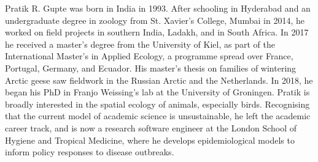 \label{ch:pubs}

\begingroup

Pratik R. Gupte was born in India in 1993.
After schooling in Hyderabad and an undergraduate degree in zoology from St. Xavier's College, Mumbai in 2014, he worked on field projects in southern India, Ladakh, and in South Africa.
In 2017 he received a master's degree from the University of Kiel, as part of the International Master's in Applied Ecology, a programme spread over France, Portugal, Germany, and Ecuador.
His master's thesis on families of wintering Arctic geese saw fieldwork in the Russian Arctic and the Netherlands.
In 2018, he began his PhD in Franjo Weissing's lab at the University of Groningen.
Pratik is broadly interested in the spatial ecology of animals, especially birds.
Recognising that the current model of academic science is unsustainable, he left the academic career track, and is now a research software engineer at the London School of Hygiene and Tropical Medicine, where he develops epidemiological models to inform policy responses to disease outbreaks.

\let\clearpage\relax
\let\cleardoublepage\relax
\let\cleardoublepage\relax

\begin{refsection}
    \small
    \nocite{gupte2021a,gupte2022c,gupte2022d,thaker2019,nathan2022,netz2022,ramesh2022,
        bijleveld2021,rimbach2022un,gupte2019} %
    \printbibliography[title=Author Publications]
\end{refsection}

\begin{refsection}
    \small
    \nocite{gupte2022,gupte2022e,gupte2022b,gupte2021b,gupte2020a,gupte2022f,netz2021b,netz2022a,netz2021b} %
    \printbibliography[title=Data and Code]
\end{refsection}

\endgroup

{ \begin{center}  \end{center} }

